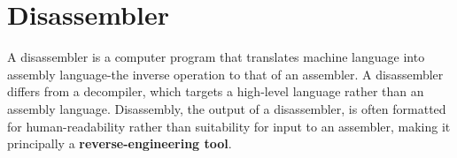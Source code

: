 \chapter{Disassembler}
A disassembler is a computer program that translates machine language into assembly language-the inverse operation to that of an assembler. A disassembler differs from a decompiler, which targets a high-level language rather than an assembly language. Disassembly, the output of a disassembler, is often formatted for human-readability rather than suitability for input to an assembler, making it principally a \textbf{reverse-engineering tool}.



